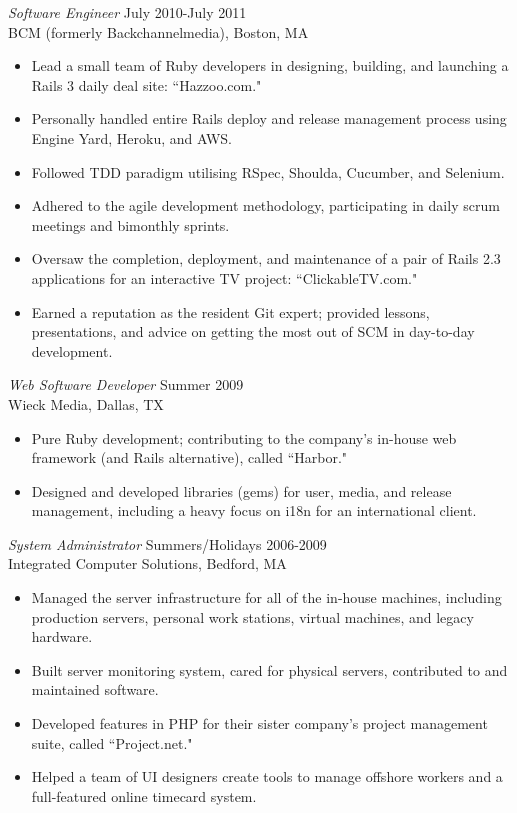 \documentclass[line,margin]{res}
\begin{document}
\begin{resume}
  {\sl Software Engineer}  \hfill July 2010-July 2011 \\
  BCM (formerly Backchannelmedia),
  Boston, MA
  \begin{itemize}  \itemsep -2pt %
    \item Lead a small team of Ruby developers in designing, building, and launching a Rails 3 daily deal site: ``Hazzoo.com."
    \item Personally handled entire Rails deploy and release management process using Engine Yard, Heroku, and AWS.
    \item Followed TDD paradigm utilising RSpec, Shoulda, Cucumber, and Selenium.
    \item Adhered to the agile development methodology, participating in daily scrum meetings and bimonthly sprints.
    \item Oversaw the completion, deployment, and maintenance of a pair of Rails 2.3 applications for an interactive TV project: ``ClickableTV.com."
    \item Earned a reputation as the resident Git expert; provided lessons, presentations, and advice on getting the most out of SCM in day-to-day development.
  \end{itemize}

  {\sl Web Software Developer}  \hfill Summer 2009 \\
  Wieck Media,
  Dallas, TX
  \begin{itemize}  \itemsep -2pt %
    \item Pure Ruby development; contributing to the company's in-house web framework (and Rails alternative), called ``Harbor."
    \item Designed and developed libraries (gems) for user, media, and release management, including a heavy focus on i18n for an international client.
  \end{itemize}

  {\sl System Administrator}  \hfill Summers/Holidays 2006-2009 \\
  Integrated Computer Solutions,
  Bedford, MA
  \begin{itemize}  \itemsep -2pt %
       \item Managed the server infrastructure for all of the in-house machines, including production servers, personal work stations, virtual machines, and legacy hardware.
       \item Built server monitoring system, cared for physical servers, contributed to and maintained software.
       \item Developed features in PHP for their sister company's project management suite, called ``Project.net."
       \item Helped a team of UI designers create tools to manage offshore workers and a full-featured online timecard system.
  \end{itemize}


\end{resume}
\end{document}
